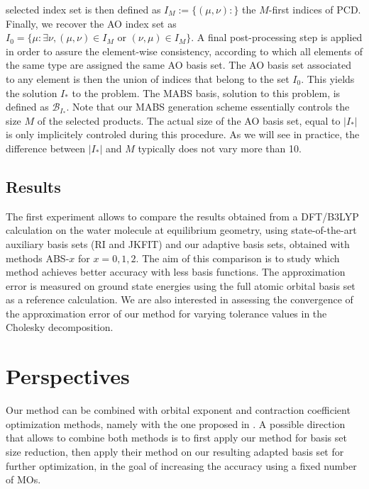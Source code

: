 \documentclass[a4paper,11pt]{article}
\begin{document}
selected index set is then defined as $I_M:=\{(\mu,\nu)\colon\}$ the $M$-first
indices of PCD. Finally, we recover the AO 
index set as $I_0=\{\mu\colon \exists\nu, (\mu,\nu)\in I_M \text{ or }(\nu,\mu)\in I_M\}$.
A final post-processing step is applied in order to assure the element-wise
consistency, according to which all elements of the same type are assigned the
same AO basis set. The AO basis set associated to any element is then the union
of indices that belong to the set $I_0$. This yields the solution $I_*$ to the
problem. The MABS basis, solution to this problem, is defined as $\mathcal
B_{I_*}$. Note that our MABS generation scheme essentially controls the size $M$
of the selected products. The actual size of the AO basis set, equal to $|I_*|$
is only implicitely controled during this procedure. As we will see in practice,
the difference between $|I_*|$ and $M$ typically does not vary more than 10.

\subsection{Results}

The first experiment allows to compare the results obtained from a DFT/B3LYP
calculation on the water molecule at equilibrium geometry, using
state-of-the-art auxiliary basis sets (RI and JKFIT) and our adaptive basis
sets, obtained with methods ABS-$x$ for $x=0,1,2$. 
The aim of this comparison is to study which method achieves better
accuracy with less basis functions. The approximation error is measured on
ground state energies using the full atomic orbital basis set as a reference
calculation. We are also interested in assessing the convergence of the
approximation error of our method for varying tolerance values in the Cholesky
decomposition.

\section{Perspectives}

Our method can be combined with orbital exponent and contraction coefficient
optimization methods, namely with the one proposed in \cite{wang2023basis}. A
possible direction that allows to combine both methods is to first apply our
method for basis set size reduction, then apply their method on our resulting 
adapted basis set for further optimization, in the goal of increasing the 
accuracy using a fixed number of MOs.



\end{document}
